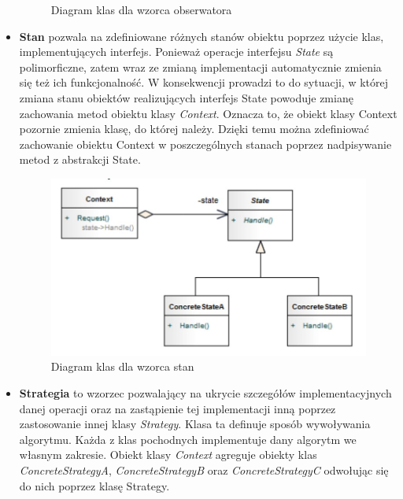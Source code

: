 \documentclass[a4paper,12pt,oneside]{book}
\begin{document}
\begin{itemize}
\begin{figure}[h]
                        \caption{Diagram klas dla wzorca obserwatora}
                        \label{fig:twojastara15}
                    \end{figure}
                    \item \textbf{Stan} pozwala na zdefiniowane różnych stanów obiektu poprzez użycie klas, implementujących interfejs. Ponieważ operacje interfejsu \textit{State} są polimorficzne, zatem wraz ze zmianą implementacji automatycznie zmienia się też ich funkcjonalność. W konsekwencji prowadzi to do sytuacji, w której zmiana stanu obiektów realizujących interfejs State powoduje zmianę zachowania metod obiektu klasy \textit{Context}. Oznacza to, że obiekt klasy Context pozornie zmienia klasę, do której należy. Dzięki temu można zdefiniować zachowanie obiektu Context w poszczególnych stanach poprzez nadpisywanie metod z abstrakcji State.
                    \begin{figure}[h]
                        \centering
                        \includegraphics[width=\textwidth/2]{images/state.jpg}
                        \caption{Diagram klas dla wzorca stan}
                        \label{fig:twojastara16}
                    \end{figure}
                    \item \textbf{Strategia} to wzorzec pozwalający na ukrycie szczegółów implementacyjnych danej operacji oraz na zastąpienie tej implementacji inną poprzez zastosowanie innej klasy \textit{Strategy}. Klasa ta definuje sposób wywoływania algorytmu. Każda z klas pochodnych implementuje dany algorytm we własnym zakresie. Obiekt klasy \textit{Context} agreguje obiekty klas \textit{ConcreteStrategyA}, \textit{ConcreteStrategyB} oraz \textit{ConcreteStrategyC} odwołując się do nich poprzez klasę Strategy.
                    \begin{figure}[h]

\end{figure}
\end{itemize}
\end{document}
